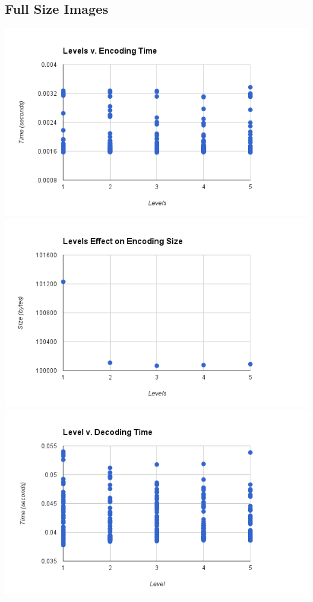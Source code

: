 \documentclass{article}
\begin{document}
\noindent \subsection{Full Size Images}
\includegraphics[scale=0.8]{images/betterlevel_v_encode}\\
\includegraphics[scale=0.8]{images/lvl_encodingsize}\\
\includegraphics[scale=0.8]{images/betterlevel_v_decode}\\
\end{document}
